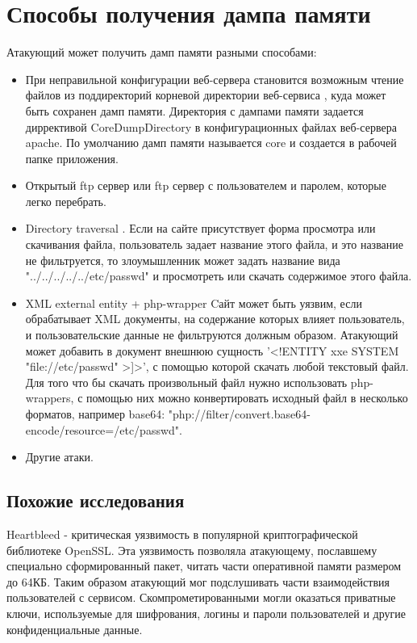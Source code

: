 \documentclass[20pt]{article}
\begin{document}
\newpage

\section{Способы получения дампа памяти}

Атакующий может получить дамп памяти разными способами:
\begin{itemize}
  \item При неправильной конфигурации веб-сервера становится возможным чтение
  файлов из поддиректорий корневой директории веб-сервиса \cite{directory-listing},
  куда может быть сохранен дамп памяти. Директория с дампами памяти задается
  диррективой CoreDumpDirectory в конфигурационных файлах веб-сервера apache.
  По умолчанию дамп памяти называется core и создается в рабочей папке приложения.
  \item Открытый ftp сервер или ftp сервер с пользователем и паролем, которые
  легко перебрать.
  \item Directory traversal \cite{directory-traversal}.
  Если на сайте присутствует форма просмотра или скачивания файла,
  пользователь задает название этого файла, и это название не фильтруется, то
  злоумышленник может задать название вида "../../../../../etc/passwd" и просмотреть
  или скачать содержимое этого файла.
  \item XML external entity \cite{xxe} + php-wrapper \cite{php-wrappers}
  Cайт может быть уязвим, если обрабатывает XML документы, на содержание которых
  влияет пользователь, и пользовательские данные не фильтруются должным образом.
  Атакующий может добавить в документ внешнюю сущность '<!ENTITY xxe SYSTEM "file://etc/passwd" >]>',
  с помощью которой скачать любой текстовый файл. Для того что бы скачать
  произвольный файл нужно использовать php-wrappers, с помощью них можно
  конвертировать исходный файл в несколько форматов, например base64:
  "php://filter/convert.base64-encode/resource=/etc/passwd".
  \item Другие атаки.
\end{itemize}

\subsection{Похожие исследования}

Heartbleed \cite{heartbleed} - критическая уязвимость в популярной криптографической
библиотеке OpenSSL. Эта уязвимость позволяла атакующему, пославшему специально
сформированный пакет, читать части оперативной памяти размером до 64КБ. Таким
образом атакующий мог подслушивать части взаимодействия пользователей с сервисом.
Скомпрометированными могли оказаться приватные ключи, используемые для шифрования,
логины и пароли пользователей и другие конфиденциальные данные.
\end{document}

